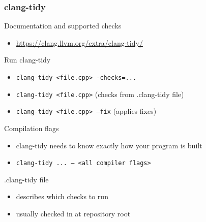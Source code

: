 \begin{frame}[fragile]
  \frametitle{clang-tidy}
  \begin{block}{Documentation and supported checks}
    \begin{itemize}
      \item \url{https://clang.llvm.org/extra/clang-tidy/}
    \end{itemize}
  \end{block}
  \begin{block}{Run clang-tidy}
    \begin{itemize}
      \item \texttt{clang-tidy <file.cpp> -checks=...}
      \item \texttt{clang-tidy <file.cpp>} (checks from .clang-tidy file)
      \item \texttt{clang-tidy <file.cpp> --fix} (applies fixes)

    \end{itemize}
  \end{block}
  \begin{block}{Compilation flags}
    \begin{itemize}
      \item clang-tidy needs to know exactly how your program is built
      \item \texttt{clang-tidy ... -- <all compiler flags>}
    \end{itemize}
  \end{block}
  \begin{block}{.clang-tidy file}
    \begin{itemize}
      \item describes which checks to run
      \item usually checked in at repository root
    \end{itemize}
  \end{block}
\end{frame}


